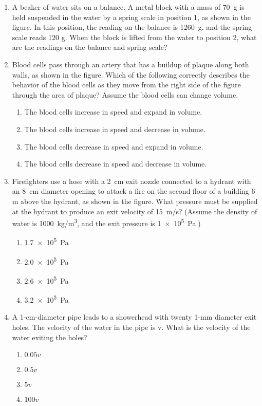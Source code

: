 \documentclass{../../oss-apphys}
\begin{document}
\begin{multicols}{2}
\begin{enumerate}[leftmargin=18pt,start=3]
  \item A beaker of water sits on a balance. A metal block with a mass of
    \SI{70}{\gram} is held suspended in the water by a spring scale in position
    1, as shown in the figure. In this position, the reading on the balance is
    \SI{1260}{\gram}, and the spring scale reads 120 g. When the block is
    lifted from the water to position 2, what are the readings on the balance
    and spring scale?

  \item Blood cells pass through an artery that has a buildup of plaque along
    both walls, as shown in the figure. Which of the following correctly
    describes the behavior of the blood cells as they move from the right
    side of the figure through the area of plaque? Assume the blood cells
    can change volume.
    \begin{enumerate}[noitemsep,topsep=0pt,leftmargin=18pt,label=(\Alph*)]
    \item The blood cells increase in speed and expand in volume.
    \item The blood cells increase in speed and decrease in volume.
    \item The blood cells decrease in speed and expand in volume.
    \item The blood cells decrease in speed and decrease in volume.
    \end{enumerate}
    
  \item Firefighters use a hose with a \SI{2}{cm} exit nozzle connected to a
    hydrant with an \SI{8}{cm} diameter opening to attack a fire on the second
    floor of a building 6 m above the hydrant, as shown in the figure. What
    pressure must be supplied at the hydrant to produce an exit velocity of
    \SI{15}{m/s}? (Assume the density of water is \SI{1000}{kg/m^3}, and the
    exit pressure is \SI{1e5}{\pascal}.)
    \begin{enumerate}[noitemsep,topsep=0pt,leftmargin=18pt,label=(\Alph*)]
    \item\SI{1.7e5}{\pascal}
    \item\SI{2.0e5}{\pascal}
    \item\SI{2.6e5}{\pascal}
    \item\SI{3.2e5}{\pascal}
    \end{enumerate}
    
  \item A 1-cm-diameter pipe leads to a showerhead with twenty 1-mm
    diameter exit holes. The velocity of the water in the pipe is v. What is
    the velocity of the water exiting the holes?
    \begin{enumerate}[noitemsep,topsep=0pt,leftmargin=18pt,label=(\Alph*)]
    \item $0.05v$
    \item $0.5v$
    \item $5v$
    \item $100v$
    \end{enumerate}


\end{enumerate}
\end{multicols}
\end{document}
